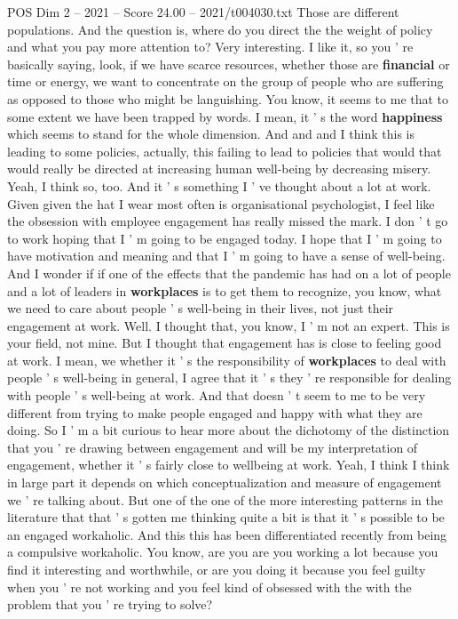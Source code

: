 \begin{textsample}{POS Dim 2 – 2021 – Score 24.00 – 2021/t004030.txt}
Those are different populations.
And the question is, where do you direct the the weight of policy and what you pay more attention to?
Very interesting.
I like it, so you ' re basically saying, look, if we have scarce resources, whether those are \textbf{financial} or time or energy, we want to concentrate on the group of people who are suffering as opposed to those who might be languishing.
You know, it seems to me that to some extent we have been trapped by words.
I mean, it ' s the word \textbf{happiness} which seems to stand for the whole dimension.
And and and I think this is leading to some policies, actually, this failing to lead to policies that would that would really be directed at increasing human well-being by decreasing misery.
Yeah, I think so, too.
And it ' s something I ' ve thought about a lot at work.
Given given the hat I wear most often is organisational psychologist, I feel like the obsession with employee engagement has really missed the mark.
I don ' t go to work hoping that I ' m going to be engaged today.
I hope that I ' m going to have motivation and meaning and that I ' m going to have a sense of well-being.
And I wonder if if one of the effects that the pandemic has had on a lot of people and a lot of leaders in \textbf{workplaces} is to get them to recognize, you know, what we need to care about people ' s well-being in their lives, not just their engagement at work.
Well.
I thought that, you know, I ' m not an expert.
This is your field, not mine.
But I thought that engagement has is close to feeling good at work.
I mean, we whether it ' s the responsibility of \textbf{workplaces} to deal with people ' s well-being in general, I agree that it ' s they ' re responsible for dealing with people ' s well-being at work.
And that doesn ' t seem to me to be very different from trying to make people engaged and happy with what they are doing.
So I ' m a bit curious to hear more about the dichotomy of the distinction that you ' re drawing between engagement and will be my interpretation of engagement, whether it ' s fairly close to wellbeing at work.
Yeah, I think I think in large part it depends on which conceptualization and measure of engagement we ' re talking about.
But one of the one of the more interesting patterns in the literature that that ' s gotten me thinking quite a bit is that it ' s possible to be an engaged workaholic.
And this this has been differentiated recently from being a compulsive workaholic.
You know, are you are you working a lot because you find it interesting and worthwhile, or are you doing it because you feel guilty when you ' re not working and you feel kind of obsessed with the with the problem that you ' re trying to solve?

\end{textsample}
